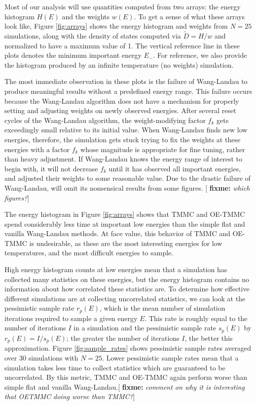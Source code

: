 \documentclass[11pt]{article}
\newcommand{\p}[1]{\left(#1\right)} %
\newcommand{\red}[1]{{\bf \color{red} #1}}
\newcommand{\fixme}[1]{[\red{fixme:} \emph{#1}]}
\begin{document}
Most of our analysis will use quantities computed from two arrays: the
energy histogram $H\p{E}$ and the weights $w\p{E}$. To get a sense of
what these arrays look like, Figure \ref{fig:arrays} shows the energy
histogram and weights from $N=25$ simulations, along with the density
of states computed via $\tilde D=H/w$ and normalized to have a maximum
value of 1. The vertical reference line in these plots denotes the
minimum important energy $E_-$. For reference, we also provide the
histogram produced by an infinite temperature (no weights) simulation.

The most immediate observation in these plots is the failure of
Wang-Landau to produce meaningful results without a predefined energy
range. This failure occurs because the Wang-Landau algorithm does not
have a mechanism for properly setting and adjusting weights on newly
observed energies. After several reset cycles of the Wang-Landau
algorithm, the weight-modifying factor $f_k$ gets exceedingly small
relative to its initial value. When Wang-Landau finds new low
energies, therefore, the simulation gets stuck trying to fix the
weights at these energies with a factor $f_k$ whose magnitude is
appropriate for fine tuning, rather than heavy adjustment. If
Wang-Landau knows the energy range of interest to begin with, it will
not decrease $f_k$ until it has observed all important energies, and
adjusted their weights to some reasonable value. Due to the drastic
failure of Wang-Landau, will omit its nonsensical results from some
figures. \fixme{which figures?}

The energy histogram in Figure \ref{fig:arrays} shows that TMMC and
OE-TMMC spend considerably less time at important low energies than
the simple flat and vanilla Wang-Landau methods. At face value, this
behavior of TMMC and OE-TMMC is undesirable, as these are the most
interesting energies for low temperatures, and the most difficult
energies to sample.

High energy histogram counts at low energies mean that a simulation
has collected many statistics on these energies, but the energy
histogram contains no information about how correlated these
statistics are. To determine how effective different simulations are
at collecting uncorrelated statistics, we can look at the pessimistic
sample rate $r_p\p{E}$, which is the mean number of simulation
iterations required to sample a given energy $E$. This rate is roughly
equal to the number of iterations $I$ in a simulation and the
pessimistic sample rate $s_p\p{E}$ by $r_p\p{E}=I/s_p\p{E}$; the
greater the number of iterations $I$, the better this
approximation. Figure \ref{fig:sample_rates} shows pessimistic sample
rates averaged over 30 simulations with $N=25$. Lower pessimistic
sample rates mean that a simulation takes less time to collect
statistics which are guaranteed to be uncorrelated. By this metric,
TMMC and OE-TMMC again perform worse than simple flat and vanilla
Wang-Landau.\fixme{comment on why it is interesting that OETMMC doing
  worse than TMMC?}
\end{document}
